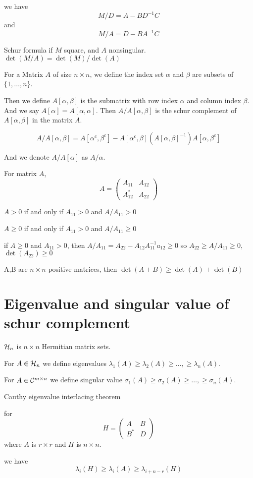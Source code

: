 we have 
$$M/D = A - BD^{-1}C$$
and
$$M/A = D - BA^{-1}C$$

\begin{lemma}
  Schur formula
  if $M$ square, and $A$ nonsingular.
  $\det(M/A) = \det(M)/ \det(A)$
\end{lemma}

For a Matrix $A$ of size $n \times n$,
we define the index set $\alpha$ and $\beta$ are subsets of $\{1,\dots,n\}$.

Then we define $A[\alpha,\beta]$ is the submatrix with row index $\alpha$ and column index $\beta$.
And we say $A[\alpha] = A[\alpha,\alpha]$.
Then $A/A[\alpha,\beta]$ is the schur complement of $A[\alpha,\beta]$ in the matrix $A$.

$$
A/A[\alpha,\beta] = A[\alpha^c,\beta^c] - A[\alpha^c,\beta](A[\alpha,\beta]^{-1})A[\alpha,\beta^c]
$$

And we denote $A/A[\alpha]$ as $A/\alpha$.


For matrix $A$,
$$
A=\left(\begin{array}{cc}
  A_{11} & A_{12} \\
  A_{12}^* & A_{22}
  \end{array}\right)
$$

$A >0$ if and only if $A_{11}>0$ and $A/A_{11} >0$

$A \geq 0$ if and only if $A_{11}>0$ and $A/A_{11} \geq 0$

if $A \geq 0$
and $A_{11} >0$,
then $A/A_{11} = A_{22} - A_{12}A_{11}^{-1} a_{12} \geq 0$
so
$A_{22} \geq A/A_{11} \geq 0$,
$\det(A_{22})\geq 0$

\begin{lemma}
  A,B are $n\times n$ positive matrices, then 
  $\det(A+B) \geq \det(A) + \det(B)$
\end{lemma}

\section*{Eigenvalue and singular value of schur complement}

$\mathcal{H}_n$ is $n\times n$ Hermitian matrix sets.

For $A \in \mathcal{H}_n$ we define eigenvalues 
$\lambda_1(A) \geq \lambda_2(A) \geq \dots,\geq \lambda_n(A)$.


For $A \in \mathcal{C}^{m\times n}$ we define singular value 
$\sigma_1(A) \geq \sigma_2(A) \geq \dots,\geq \sigma_n(A)$.




\begin{lemma}
  Cauthy eigenvalue interlacing theorem

  for 
  $$
  H=\left(\begin{array}{cc}
  A & B \\
  B^* & D
  \end{array}\right)
$$
where $A$ is $r \times r$ and $H$ is $n \times n$.

we have
$$
\lambda_i(H) \geq \lambda_i(A)\geq \lambda_{i+n-r}(H)
$$
\end{lemma}


